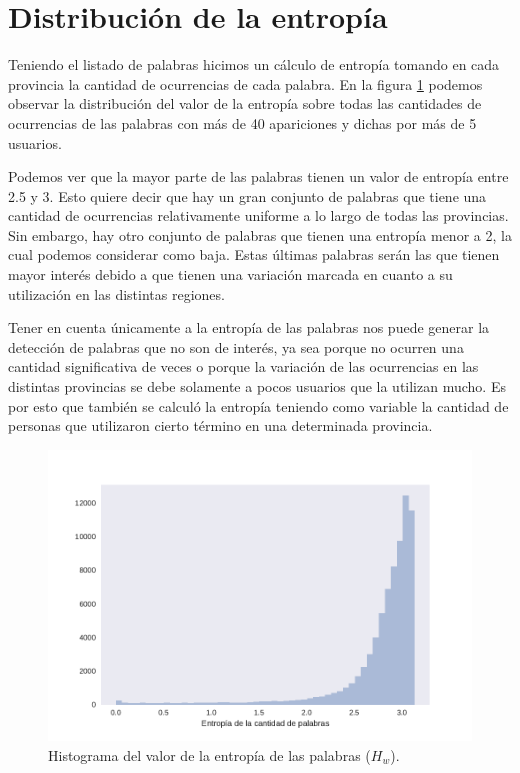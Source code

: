 




\section{Distribución de la entropía}
Teniendo el listado de palabras hicimos un cálculo de entropía tomando en cada provincia la cantidad de ocurrencias de cada palabra. En la figura \ref{fig:entropiaPalabras} podemos observar la distribución del valor de la entropía sobre todas las cantidades de ocurrencias de las palabras con más de 40 apariciones y dichas por más de 5 usuarios.

Podemos ver que la mayor parte de las palabras tienen un valor de entropía entre 2.5 y 3. Esto quiere decir que hay un gran conjunto de palabras que tiene una cantidad de ocurrencias relativamente uniforme a lo largo de todas las provincias. Sin embargo, hay otro conjunto de palabras que tienen una entropía menor a 2, la cual podemos considerar como baja. Estas últimas palabras serán las que tienen mayor interés debido a que tienen una variación marcada en cuanto a su utilización en las distintas regiones.

Tener en cuenta únicamente a la entropía de las palabras nos puede generar la detección de palabras que no son de interés, ya sea porque no ocurren una cantidad significativa de veces o porque la variación de las ocurrencias en las distintas provincias se debe solamente a pocos usuarios que la utilizan mucho. Es por esto que también se calculó la entropía teniendo como variable la cantidad de personas que utilizaron cierto término en una determinada provincia.


\begin{figure}[ht]
\centering
\includegraphics[width=1.0\textwidth]{./images/DistribucionEntropia.pdf}
\caption{Histograma del valor de la entropía de las palabras ($H_w$).} 
\label{fig:entropiaPalabras} 
\end{figure}



